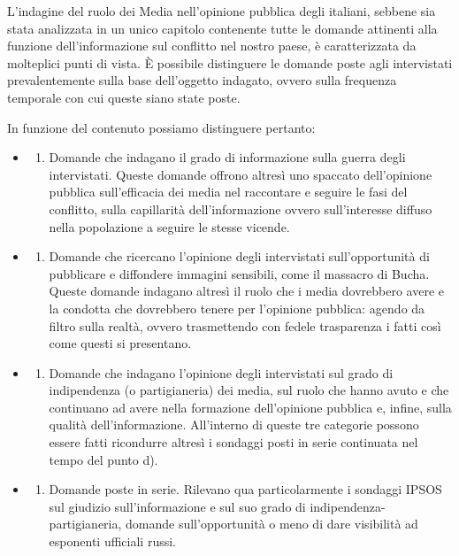 \documentclass[
]{book}
\providecommand{\tightlist}{%
  \setlength{\itemsep}{0pt}\setlength{\parskip}{0pt}}
\begin{document}
L'indagine del ruolo dei Media nell'opinione pubblica degli italiani, sebbene sia stata analizzata in un unico capitolo contenente tutte le domande attinenti alla funzione dell'informazione sul conflitto nel nostro paese, è caratterizzata da molteplici punti di vista. È possibile distinguere le domande poste agli intervistati prevalentemente sulla base dell'oggetto indagato, ovvero sulla frequenza temporale con cui queste siano state poste.

In funzione del contenuto possiamo distinguere pertanto:

\begin{itemize}
\item
  \begin{enumerate}
  \def\labelenumi{\alph{enumi})}
  \tightlist
  \item
    Domande che indagano il grado di informazione sulla guerra degli intervistati. Queste domande offrono altresì uno spaccato dell'opinione pubblica sull'efficacia dei media nel raccontare e seguire le fasi del conflitto, sulla capillarità dell'informazione ovvero sull'interesse diffuso nella popolazione a seguire le stesse vicende.
  \end{enumerate}
\item
  \begin{enumerate}
  \def\labelenumi{\alph{enumi})}
  \setcounter{enumi}{1}
  \tightlist
  \item
    Domande che ricercano l'opinione degli intervistati sull'opportunità di pubblicare e diffondere immagini sensibili, come il massacro di Bucha. Queste domande indagano altresì il ruolo che i media dovrebbero avere e la condotta che dovrebbero tenere per l'opinione pubblica: agendo da filtro sulla realtà, ovvero trasmettendo con fedele trasparenza i fatti così come questi si presentano.
  \end{enumerate}
\item
  \begin{enumerate}
  \def\labelenumi{\alph{enumi})}
  \setcounter{enumi}{2}
  \tightlist
  \item
    Domande che indagano l'opinione degli intervistati sul grado di indipendenza (o partigianeria) dei media, sul ruolo che hanno avuto e che continuano ad avere nella formazione dell'opinione pubblica e, infine, sulla qualità dell'informazione. All'interno di queste tre categorie possono essere fatti ricondurre altresì i sondaggi posti in serie continuata nel tempo del punto d).
  \end{enumerate}
\item
  \begin{enumerate}
  \def\labelenumi{\alph{enumi})}
  \setcounter{enumi}{3}
  \tightlist
  \item
    Domande poste in serie. Rilevano qua particolarmente i sondaggi IPSOS sul giudizio sull'informazione e sul suo grado di indipendenza-partigianeria, domande sull'opportunità o meno di dare visibilità ad esponenti ufficiali russi.
  \end{enumerate}
\end{itemize}
\end{document}
